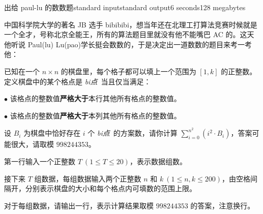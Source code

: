 \begin{problem}{出给 paul-lu 的数数题}{standard input}{standard output}{6 seconds}{128 megabytes}

    中国科学院大学的著名 JB 选手 bibibibi，想当年还在北理工打算法竞赛时候就是一个全才，号称北京全能王，所有的算法题目里就没有他不能嘴巴 AC 的。这天他听说 Paul(lu) Lu(pao)学长挺会数数的，于是决定出一道数数的题目来考一考他：

    已知在一个 $n\times n$ 的棋盘里，每个格子都可以填上一个范围为 $[1,k]$ 的正整数。定义棋盘中的某个格点是 \textit{bi点}\ 当且仅当满足：

    $\bullet$ 该格点的整数值\textbf{严格大于}本行其他所有格点的整数值。

    $\bullet$ 该格点的整数值\textbf{严格大于}本列其他所有格点的整数值。
    
    设 $B_i$ 为棋盘中恰好存在 $i$ 个 \textit{bi点}\ 的方案数，请你计算 $\sum\limits_{i=0}^{n^2} (i^2\cdot B_i) $，答案可能很大，请取模 $998244353$。

    \InputFile
    
    第一行输入一个正整数 $T\ (1\le T\le 20)$，表示数据组数。

    接下来 $T$ 组数据，每组数据输入两个正整数 $n$ 和 $k\ (1\le n, k\le 200)$，由空格间隔开，分别表示棋盘的大小和每个格点内可填数的范围上限。
    
    \OutputFile
    
    对于每组数据，请输出一行，表示计算结果取模 $998244353$ 的答案，注意换行。
    
    \Example
    
    \begin{example}
    \end{example}
    

\end{problem}